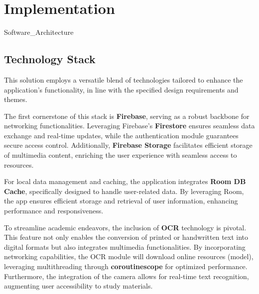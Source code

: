 
\chapter{Implementation}\label{implementation}

{Software_Architecture}

\section{Technology Stack}

This solution employs a versatile blend of technologies tailored to enhance the application's functionality, in line with the specified design requirements and themes.

The first cornerstone of this stack is \textbf{Firebase}, serving as a robust backbone for networking functionalities. Leveraging Firebase's \textbf{Firestore} ensures seamless data exchange and real-time updates, while the authentication module guarantees secure access control. Additionally, \textbf{Firebase Storage} facilitates efficient storage of multimedia content, enriching the user experience with seamless access to resources.

For local data management and caching, the application integrates \textbf{Room DB Cache}, specifically designed to handle user-related data. By leveraging Room, the app ensures efficient storage and retrieval of user information, enhancing performance and responsiveness.

To streamline academic endeavors, the inclusion of \textbf{OCR} technology is pivotal. This feature not only enables the conversion of printed or handwritten text into digital formats but also integrates multimedia functionalities. By incorporating networking capabilities, the OCR module will download online resources (model), leveraging multithreading through \textbf{coroutinescope} for optimized performance. Furthermore, the integration of the camera allows for real-time text recognition, augmenting user accessibility to study materials. %

